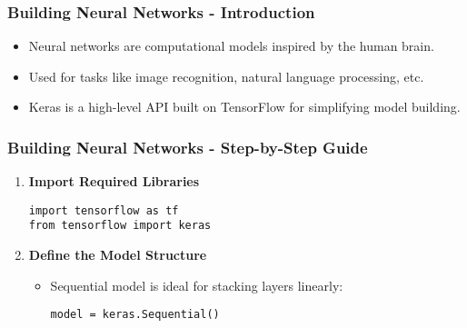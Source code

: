 \documentclass[aspectratio=169]{beamer}
\begin{document}
\begin{frame}[fragile]
    \frametitle{Building Neural Networks - Introduction}
    \begin{itemize}
        \item Neural networks are computational models inspired by the human brain.
        \item Used for tasks like image recognition, natural language processing, etc.
        \item Keras is a high-level API built on TensorFlow for simplifying model building.
    \end{itemize}
\end{frame}

\begin{frame}[fragile]
    \frametitle{Building Neural Networks - Step-by-Step Guide}
    \begin{enumerate}
        \item \textbf{Import Required Libraries}
        \begin{lstlisting}
import tensorflow as tf
from tensorflow import keras
        \end{lstlisting}

        \item \textbf{Define the Model Structure}
        \begin{itemize}
            \item Sequential model is ideal for stacking layers linearly:
            \begin{lstlisting}
model = keras.Sequential()
            \end{lstlisting}
        \end{itemize}
    \end{enumerate}
\end{frame}
\end{document}
